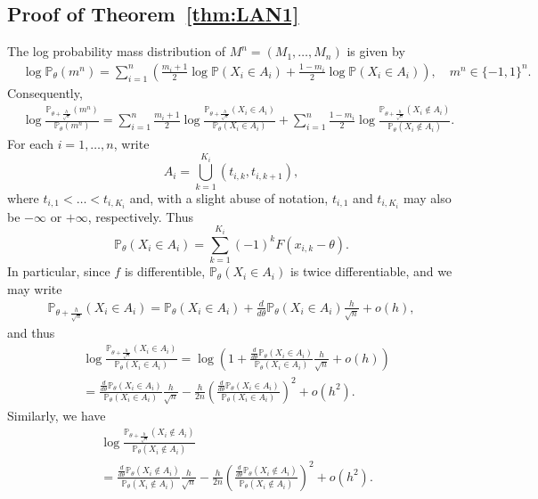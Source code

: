 \documentclass[letterpaper, 11pt]{IEEEtran}      %
\newcommand{\Prob}{\mathbb{P} }
\begin{document}
\subsection*{Proof of Theorem~\ref{thm:LAN1}}
The log probability mass distribution of $M^n=(M_1,\ldots,M_n)$ is given by
\begin{align*}
& \log \Prob_\theta(m^n) = \sum_{i=1}^n \left( \frac{m_i+1}{2} \log  \Prob(X_i\in A_i) + 
\frac{1-m_i}{2} \log \Prob(X_i\in A_i) \right), \quad m^n \in \{-1,1\}^n. 
\end{align*}
Consequently, 
\begin{align}
& \log \frac{ \Prob_{\theta + \frac{h}{\sqrt{n}}}(m^n)} { \Prob_\theta (m^n) } = \sum_{i=1}^n    \frac{m_i+1}{2} 
\log \frac{\Prob_{\theta+\frac{h}{\sqrt{n}}}(X_i \in A_i)}{\Prob_{\theta}(X_i \in A_i)} + 
\sum_{i=1}^n  \frac{1-m_i}{2} 
\log \frac{\Prob_{\theta+\frac{h}{\sqrt{n}}}(X_i \notin A_i)}{\Prob_{\theta}(X_i \notin A_i)}. 
\label{eq:LAN_proof1}
\end{align}
For each $i=1,\ldots,n$, write 
\[
A_i = \bigcup_{k=1}^{K_i} \left(t_{i,k},t_{i,k+1} \right),
\]
where $t_{i,1}<\ldots<t_{i,K_i}$ and, with a slight abuse of notation, $t_{i,1}$ and $t_{i,K_i}$ may also be $-\infty$ or $+\infty$, respectively. Thus
\[
\Prob_{\theta}(X_i \in A_i) = \sum_{k=1}^{K_i} (-1)^k F(x_{i,k}-\theta).
\]
In particular, since $f$ is differentible, $\Prob_{\theta}(X_i \in A_i)$ is twice differentiable, and we may write
\begin{align*}
\Prob_{\theta+\frac{h}{\sqrt{n}}}(X_i \in A_i)  = \Prob_{\theta} (X_i \in A_i) + \frac{d}{d\theta} \Prob_{\theta}(X_i \in A_i) \frac{h}{\sqrt{n}} + o(h), 
\end{align*}
and thus
\begin{align*}
& \log \frac{\Prob_{\theta+\frac{h}{\sqrt{n}}}(X_i \in A_i)}{\Prob_{\theta}(X_i \in A_i)} = \log \left(1 + \frac{\frac{d}{d\theta} \Prob_{\theta}(X_i \in A_i)}{\Prob_{\theta}(X_i \in A_i)}  \frac{h}{\sqrt{n}} + o(h) \right) \\
& = \frac{\frac{d}{d\theta} \Prob_{\theta}(X_i \in A_i)}{\Prob_{\theta}(X_i \in A_i)}  \frac{h}{\sqrt{n}} - \frac{h}{2n} \left( \frac{\frac{d}{d\theta} \Prob_{\theta}(X_i \in A_i)}{\Prob_{\theta}(X_i \in A_i)}  \right)^2 + o(h^2). 
\end{align*}
Similarly, we have
\begin{align*}
& \log \frac{\Prob_{\theta+\frac{h}{\sqrt{n}}}(X_i \notin A_i)}{\Prob_{\theta}(X_i \notin A_i)} \\
& = \frac{\frac{d}{d\theta} \Prob_{\theta}(X_i \notin A_i)}{\Prob_{\theta}(X_i \notin A_i)}  \frac{h}{\sqrt{n}} - \frac{h}{2n} \left( \frac{\frac{d}{d\theta} \Prob_{\theta}(X_i \notin A_i)}{\Prob_{\theta}(X_i \notin A_i)}  \right)^2 + o(h^2). 
\end{align*}
\end{document}
